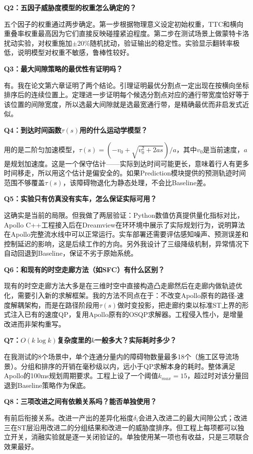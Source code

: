 \documentclass[a4paper,11pt]{ctexart}
\begin{document}
\textbf{Q2：五因子威胁度模型的权重怎么确定的？}

五个因子的权重通过两步确定。第一步根据物理意义设定初始权重，TTC和横向重叠率权重最高因为它们直接反映碰撞紧迫程度。第二步在测试场景上做蒙特卡洛扰动实验，对权重施加$\pm$20\%随机扰动，验证输出的稳定性。实验显示翻转率极低，说明模型对权重不敏感，鲁棒性较好。

\textbf{Q3：最大间隙策略的最优性有证明吗？}

有。我在论文第六章证明了两个结论。引理证明最优分割点一定出现在按横向坐标排序后的连续位置上。定理进一步证明每个候选分割点对应的通行带宽度恰好等于该位置的间隙宽度，所以选最大间隙就是选最宽通行带，是精确最优而非启发式近似。

\textbf{Q4：到达时间函数$\tau(s)$用的什么运动学模型？}

用的是二阶匀加速模型，$\tau(s) = (-v_0 + \sqrt{v_0^2 + 2as})/a$，其中$v_0$是当前速度，$a$是规划加速度。这是一个保守估计——实际到达时间可能更长，意味着行人有更多时间移走，所以用这个估计是偏安全的。如果Prediction模块提供的预测轨迹时间范围不够覆盖$\tau(s)$，该障碍物退化为静态处理，不会比Baseline差。

\textbf{Q5：实验只有仿真没有实车，怎么保证实际可用？}

这确实是当前的局限。但我做了两层验证：Python数值仿真提供量化指标对比，Apollo C++工程接入后在Dreamview在环环境中展示了实际规划行为，说明算法在Apollo完整流水线中可以正常运行。实车部署还需要评估感知噪声、预测误差和控制延迟的影响，这是后续工作的方向。另外我设计了三级降级机制，异常情况下自动回退到Baseline，保证不劣于原始系统。

\textbf{Q6：和现有的时空走廊方法（如SFC）有什么区别？}

现有的时空走廊方法大多是在三维时空中直接构造凸走廊然后在走廊内做轨迹优化，需要引入新的求解框架。我的方法不同点在于：不改变Apollo原有的路径-速度解耦架构，而是在路径阶段用$\tau(s)$做时变投影，把走廊约束以标准ST上界的形式注入已有的速度QP，复用Apollo原有的OSQP求解器。工程侵入性小，是增量改进而非架构重写。

\textbf{Q7：$O(k\log k)$复杂度里的$k$一般多大？实际耗时多少？}

在我测试的8个场景中，单个连通分量内的障碍物数量最多18个（施工区导流场景）。分组和排序的开销在毫秒级以内，远小于QP求解本身的耗时。整体满足Apollo的100ms规划周期要求。工程上设了一个阈值$k_{max}=15$，超过时对该分量回退到Baseline策略作为保底。

\textbf{Q8：三项改进之间有依赖关系吗？能否单独使用？}

有前后衔接关系。改进一产出的差异化裕度$\delta_i$会进入改进二的最大间隙公式；改进三在ST层沿用改进二的分组结果和改进一的威胁度排序。但工程上每项都可以独立开关，消融实验就是逐一关闭验证的。单独使用某一项也有收益，只是三项联合效果最好。
\end{document}
